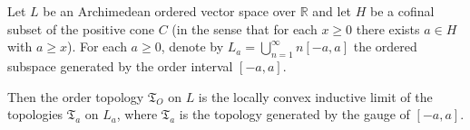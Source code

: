 Let $L$ be an Archimedean ordered vector space over $\mathbb{R}$ and let $H$ be a cofinal subset of the positive cone $C$ (in the sense that for each $x \geq 0$ there exists $a \in H$ with $a \geq x$). For each $a \geq 0$, denote by $L_a = \bigcup_{n=1}^{\infty} n[-a, a]$ the ordered subspace generated by the order interval $[-a, a]$.

Then the order topology $\mathfrak{T}_O$ on $L$ is the locally convex inductive limit of the topologies $\mathfrak{T}_a$ on $L_a$, where $\mathfrak{T}_a$ is the topology generated by the gauge of $[-a, a]$.
